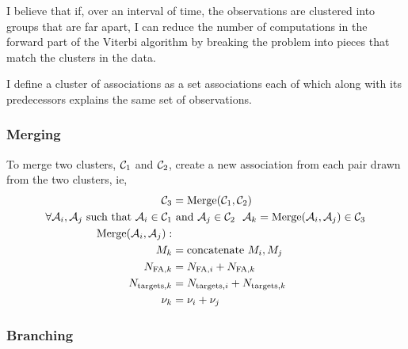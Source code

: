 \documentclass[12pt]{article}
\newcommand{\cA}{{\cal A}}
\newcommand{\cC}{{\cal C}}
\begin{document}
I believe that if, over an interval of time, the observations are
clustered into groups that are far apart, I can reduce the number of
computations in the forward part of the Viterbi algorithm by breaking
the problem into pieces that match the clusters in the data.

I define a cluster of associations as a set associations each of which
along with its predecessors explains the same set of observations.

\subsubsection{Merging}
\label{sec:merging}

To merge two clusters, $\cC_1$ and $\cC_2$, create a new association
from each pair drawn from the two clusters, ie,
\begin{align}
   \cC_3 &= \text{Merge}(\cC_1,\cC_2) \\
  \forall \cA_{i}, \cA_{j} \text{ such that } \cA_{i} \in \cC_1 &\text{
    and } \cA_{j} \in \cC_2 ~~ \cA_k = \text{Merge}(\cA_{i}, \cA_{j})
  \in \cC_3 \\
  \text{Merge}(\cA_{i}, \cA_{j}): \\
  M_k &= \text{concatenate } M_i, M_j \\
  N_{\text{FA},k} &= N_{\text{FA},i} + N_{\text{FA},k} \\
  N_{\text{targets},k} &= N_{\text{targets},i} + N_{\text{targets},k}
  \\
  \nu_k &= \nu_i +\nu_j
\end{align}

\subsubsection{Branching}
\label{sec:branching}
\end{document}
